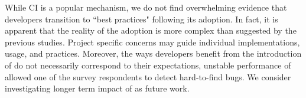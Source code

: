 
While CI is a popular mechanism, we do not 
find overwhelming evidence that developers transition to ``best practices" 
following its adoption.
In fact, it is apparent that the reality of the \Tvis adoption is more complex than suggested by the previous studies.
Project specific concerns may guide individual implementations, usage, 
and practices.
Moreover, the ways developers benefit from the introduction of \Tvis do not necessarily correspond to their
expectations, \eg unstable performance of \Tvis allowed one of the survey respondents to detect hard-to-find bugs.
We consider investigating longer term impact of \Tvis as future work.
